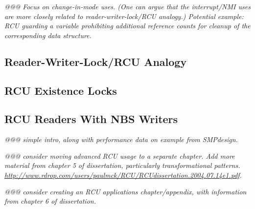 \emph{@@@ Focus on change-in-mode uses.  (One can argue that the interrupt/NMI
uses are more closely related to reader-writer-lock/RCU analogy.)
Potential example: RCU guarding a variable prohibiting additional reference
counts for cleanup of the corresponding data structure.}

\subsection{Reader-Writer-Lock/RCU Analogy}
\label{sec:advsync:Reader-Writer-Lock/RCU Analogy}

\subsection{RCU Existence Locks}
\label{sec:advsync:RCU Existence Locks}

\subsection{RCU Readers With NBS Writers}
\label{sec:advsync:RCU Readers With NBS Writers}

\emph{@@@ simple intro, along with performance data on example from SMPdesign.}

\emph{@@@ consider moving advanced RCU usage to a separate chapter.
Add more material from chapter 5 of dissertation, particularly transformational
patterns.
\url{http://www.rdrop.com/users/paulmck/RCU/RCUdissertation.2004.07.14e1.pdf}.}

\emph{@@@ consider creating an RCU applications chapter/appendix, with
information from chapter 6 of dissertation.}
